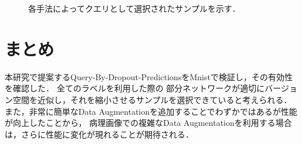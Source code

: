 \begin{figure}[hbp]
    \begin{center}
        \vspace{0.5cm}
    \caption{\label{figure:mnist_query_examples}各手法によってクエリとして選択されたサンプルを示す．}
    \end{center}
\end{figure}

\section{まとめ}
本研究で提案するQuery-By-Dropout-PredictionsをMnistで検証し，その有効性を確認した．
全てのラベルを利用した際の
部分ネットワークが適切にバージョン空間を近似し，それを縮小させるサンプルを選択できていると考えられる．
また，非常に簡単なData Augmentationを追加することでわずかではあるが性能が向上したことから，
病理画像での複雑なData Augmentationを利用する場合は，さらに性能に変化が現れることが期待される．
